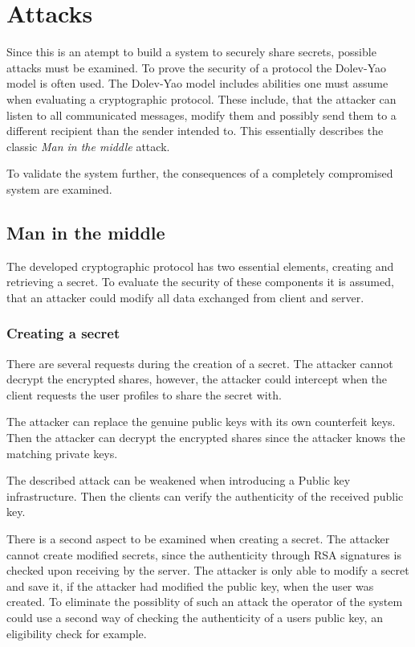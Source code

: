 \section{Attacks}

Since this is an atempt to build a system to securely share secrets, possible
attacks must be examined. To prove the security of a protocol the Dolev-Yao
model is often used. The Dolev-Yao model includes abilities one must assume
when evaluating a cryptographic protocol. These include, that the attacker can
listen to all communicated messages, modify them and possibly send them to a
different recipient than the sender intended to. This essentially describes the
classic \textit{Man in the middle} attack.

To validate the system further, the consequences of a completely compromised
system are examined.

\subsection{Man in the middle}

The developed cryptographic protocol has two essential elements, creating and
retrieving a secret. To evaluate the security of these components it is
assumed, that an attacker could modify all data exchanged from client and
server.

\subsubsection{Creating a secret}

There are several requests during the creation of a secret. The attacker cannot
decrypt the encrypted shares, however, the attacker could intercept when the
client requests the user profiles to share the secret with.

The attacker can replace the genuine public keys with its own counterfeit keys.
Then the attacker can decrypt the encrypted shares since the attacker knows the
matching private keys.

The described attack can be weakened when introducing a Public key
infrastructure. Then the clients can verify the authenticity of the received
public key.

There is a second aspect to be examined when creating a secret. The attacker
cannot create modified secrets, since the authenticity through RSA signatures
is checked upon receiving by the server. The attacker is only able to modify a
secret and save it, if the attacker had modified the public key, when the user
was created. To eliminate the possiblity of such an attack the operator of the
system could use a second way of checking the authenticity of a users public
key, an eligibility check for example.

